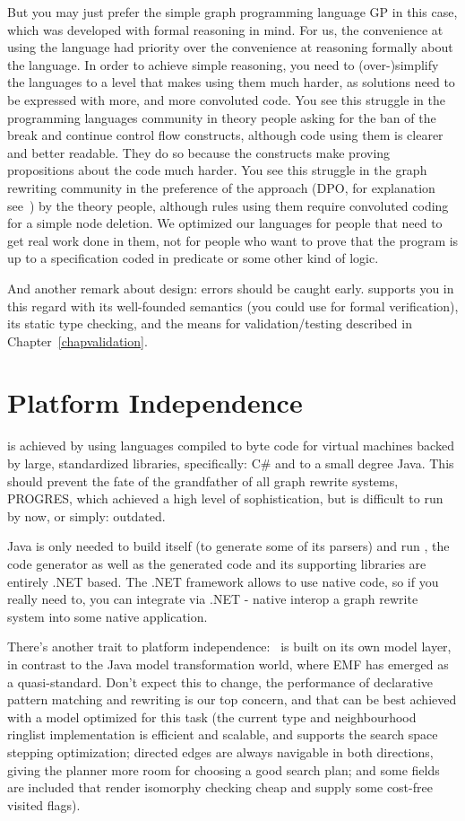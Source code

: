 But you may just prefer the simple graph programming language GP\cite{gp} in this case, which was developed with formal reasoning in mind.
For us, the convenience at using the language had priority over the convenience at reasoning formally about the language.
In order to achieve simple reasoning, you need to (over-)simplify the languages to a level that makes using them much harder, as solutions need to be expressed with more, and more convoluted code.
You see this struggle in the programming languages community in theory people asking for the ban of the break and continue control flow constructs, although code using them is clearer and better readable.
They do so because the constructs make proving propositions about the code much harder.
You see this struggle in the graph rewriting community in the preference of the  approach (DPO, for explanation see~\cite{dpoapproach}) by the theory people, although rules using them require convoluted coding for a simple node deletion.
We optimized our languages for people that need to get real work done in them, not for people who want to prove that the program is up to a specification coded in predicate or some other kind of logic. 

And another remark about design: errors should be caught early.
\GrG{} supports you in this regard with its well-founded semantics (you could use for formal verification), its static type checking, and the means for validation/testing described in Chapter~\ref{chapvalidation}.

\section{Platform Independence}
is achieved by using languages compiled to byte code for virtual machines backed by large, standardized libraries, specifically: C\# and to a small degree Java.
This should prevent the fate of the grandfather of all graph rewrite systems, PROGRES\cite{schuerr99progres},
which achieved a high level of sophistication, but is difficult to run by now, or simply: outdated.

Java is only needed to build \GrG{} itself (to generate some of its parsers) and run \yComp{}, the code generator as well as the generated code and its supporting libraries are entirely .NET based.
The .NET framework allows to use native code, so if you really need to, you can integrate via .NET - native interop a graph rewrite system into some native application.

There's another trait to platform independence: \GrG\ is built on its own model layer, in contrast to the Java model transformation world, where EMF has emerged as a quasi-standard.
Don't expect this to change, the performance of declarative pattern matching and rewriting is our top concern, and that can be best achieved with a model optimized for this task (the current type and neighbourhood ringlist implementation is efficient and scalable, and supports the search space stepping optimization; directed edges are always navigable in both directions, giving the planner more room for choosing a good search plan; and some fields are included that render isomorphy checking cheap and supply some cost-free visited flags).

